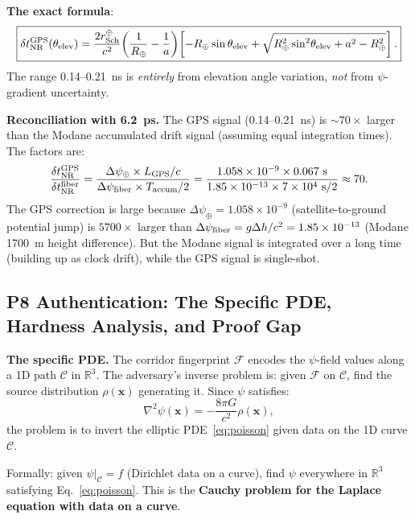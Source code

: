 \documentclass[aps,prd,twocolumn,superscriptaddress,nofootinbib]{revtex4-2}
\newcommand{\Rearth}{R_\oplus}
\newcommand{\rSch}{r_{\rm Sch}}
\begin{document}
\textbf{The exact formula}:
\begin{equation}
\boxed{
\delta t_{\rm NR}^{\rm GPS}(\theta_{\rm elev})
= \frac{2\rSch^\oplus}{c^2}\!\left(\frac{1}{\Rearth}-\frac{1}{a}\right)
\!\left[-\Rearth\sin\theta_{\rm elev}
+ \sqrt{\Rearth^2\sin^2\!\theta_{\rm elev} + a^2 - \Rearth^2}\right].
}
\label{eq:gps_full}
\end{equation}
The range 0.14--0.21~ns is \emph{entirely} from elevation angle variation,
\emph{not} from $\psi$-gradient uncertainty.

\textbf{Reconciliation with 6.2~ps.}
The GPS signal (0.14--0.21~ns) is $\sim 70\times$ larger than the Modane
accumulated drift signal (assuming equal integration times).  The factors are:
\begin{equation}
\frac{\delta t_{\rm NR}^{\rm GPS}}{\delta t_{\rm NR}^{\rm fiber}}
= \frac{\Delta\psi_\oplus \times L_{\rm GPS}/c}{\Delta\psi_{\rm fiber} \times T_{\rm accum}/2}
= \frac{1.058\times 10^{-9}\times 0.067~\text{s}}{1.85\times 10^{-13}\times 7\times 10^4~\text{s}/2}
\approx 70.
\end{equation}
The GPS correction is large because $\Delta\psi_\oplus = 1.058\times 10^{-9}$
(satellite-to-ground potential jump) is $5700\times$ larger than
$\Delta\psi_{\rm fiber} = g\Delta h/c^2 = 1.85\times 10^{-13}$ (Modane
1700~m height difference).  But the Modane signal is integrated over a long
time (building up as clock drift), while the GPS signal is single-shot.

\subsection{P8 Authentication: The Specific PDE, Hardness Analysis,
and Proof Gap}
\label{sec:pde_hardness}

\textbf{The specific PDE.}
The corridor fingerprint $\mathcal{F}$ encodes the $\psi$-field values
along a 1D path $\mathcal{C}$ in $\mathbb{R}^3$.  The adversary's inverse
problem is: given $\mathcal{F}$ on $\mathcal{C}$, find the source distribution
$\rho(\mathbf{x})$ generating it.  Since $\psi$ satisfies:
\begin{equation}
\nabla^2\psi(\mathbf{x}) = -\frac{8\pi G}{c^2}\rho(\mathbf{x}),
\label{eq:poisson}
\end{equation}
the problem is to invert the elliptic PDE~\eqref{eq:poisson} given data
on the 1D curve $\mathcal{C}$.

Formally: given $\psi|_{\mathcal{C}} = f$ (Dirichlet data on a curve),
find $\psi$ everywhere in $\mathbb{R}^3$ satisfying Eq.~\eqref{eq:poisson}.
This is the \textbf{Cauchy problem for the Laplace equation with data on
a curve}.
\end{document}
